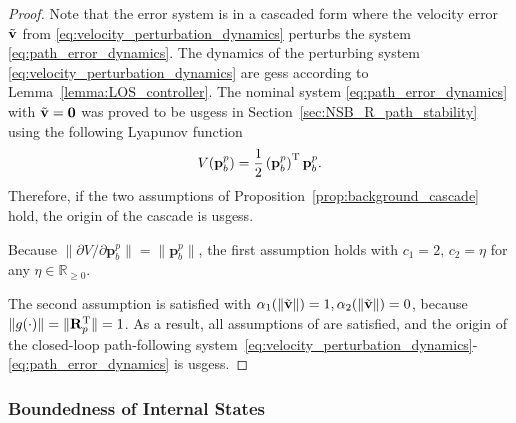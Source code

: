 \begin{proof}
    Note that the error system is in a cascaded form where the velocity error $\Tilde{\mathbf{v}}$ from \eqref{eq:velocity_perturbation_dynamics} perturbs the system \eqref{eq:path_error_dynamics}. The dynamics of the perturbing system \eqref{eq:velocity_perturbation_dynamics} are \glspl{ges} according to Lemma~\ref{lemma:LOS_controller}. The nominal system \eqref{eq:path_error_dynamics} with $\Tilde{\mathbf{v}}=\mathbf{0}$ was proved to be \glspl{usges} in Section~\ref{sec:NSB_R_path_stability} using the following Lyapunov function
\begin{equation}
    V(\mathbf{p}_b^p) = \frac{1}{2}\left(\mathbf{p}_b^p\right)^{\mathrm{T}}\mathbf{p}_b^p.
\end{equation}
Therefore, if the two assumptions of Proposition~\ref{prop:background_cascade} hold, the origin of the cascade is \glspl{usges}.

Because $\|\partial V/\partial \mathbf{p}_b^p\| = \|\mathbf{p}_b^p\|$, the first assumption holds with $c_1 = 2, \, c_2 = \eta$ for any $\eta \in \mathbb{R}_{\geq 0}$.

The second assumption is satisfied with $\alpha_1(\|\Tilde{\mathbf{v}}\|) = 1, \alpha_2(\|\Tilde{\mathbf{v}}\|) = 0$, because $\|g(\cdot)\| = \|\mathbf{R}_p^{\mathrm{T}}\| = 1$. As a result, all assumptions of \cite[Proposition 9]{pettersen_lyapunov_2017} are satisfied, and the origin of the closed-loop path-following system~\eqref{eq:velocity_perturbation_dynamics}-\eqref{eq:path_error_dynamics} is \glspl{usges}.
\end{proof}


\subsubsection{Boundedness of Internal States}
